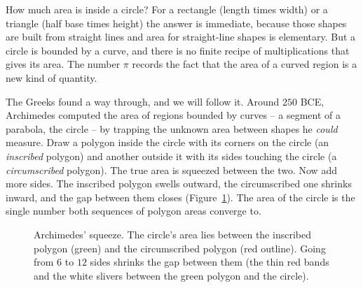 How much area is inside a circle? For a rectangle (length times width) or a
triangle (half base times height) the answer is immediate, because those shapes are
built from straight lines and area for straight-line shapes is elementary. But a
circle is bounded by a curve, and there is no finite recipe of multiplications
that gives its area. The number $\pi$ records the fact that
the area of a curved region is a new kind of quantity.

The Greeks found a way through, and we will follow it. Around
$250$ BCE, Archimedes computed the area of regions bounded by curves -- a
segment of a parabola, the circle -- by trapping the unknown area between shapes
he \emph{could} measure. Draw a polygon inside the circle with its corners on
the circle (an \emph{inscribed} polygon) and another outside it with its sides
touching the circle (a \emph{circumscribed} polygon). The true area is squeezed
between the two. Now add more sides. The inscribed polygon swells outward, the
circumscribed one shrinks inward, and the gap between them closes
(Figure~\ref{ch20:fig-archimedes}). The area of the circle is the single
number both sequences of polygon areas converge to.

\begin{figure}[htbp]
\centering
{}
\caption{Archimedes' squeeze. The circle's area lies between the inscribed
polygon (green) and the circumscribed polygon (red outline). Going from $6$ to
$12$ sides shrinks the gap between them (the thin red bands and the white slivers
between the green polygon and the circle).}
\label{ch20:fig-archimedes}
\end{figure}

